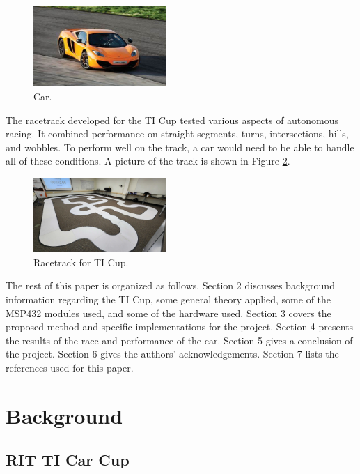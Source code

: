 \documentclass[conference]{IEEEtran}
\begin{document}
\begin{figure}[htbp]
	\centerline{\includegraphics[width=0.45\textwidth]{images/car.jpg}}
	\caption{Car.}
	\label{fig:car}
\end{figure}

The racetrack developed for the TI Cup tested various aspects of autonomous racing. It combined performance on straight segments, turns, intersections, hills, and wobbles. To perform well on the track, a car would need to be able to handle all of these conditions. A picture of the track is shown in Figure \ref{fig:track}.

\begin{figure}[htbp]
	\centerline{\includegraphics[width=0.45\textwidth]{images/track.jpg}}
	\caption{Racetrack for TI Cup.}
	\label{fig:track}
\end{figure}

The rest of this paper is organized as follows. Section 2 discusses background information regarding the TI Cup, some general theory applied, some of the MSP432 modules used, and some of the hardware used. Section 3 covers the proposed method and specific implementations for the project. Section 4 presents the results of the race and performance of the car. Section 5 gives a conclusion of the project. Section 6 gives the authors' acknowledgements. Section 7 lists the references used for this paper.

\section{Background}

\subsection{RIT TI Car Cup}
\end{document}
